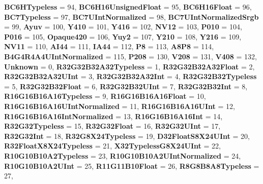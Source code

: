 \begin{DoxyCompactItemize}
{\bfseries B\+C6\+H\+Typeless} = 94, 
{\bfseries B\+C6\+H16\+Unsigned\+Float} = 95, 
\newline
{\bfseries B\+C6\+H16\+Float} = 96, 
{\bfseries B\+C7\+Typeless} = 97, 
{\bfseries B\+C7\+U\+Int\+Normalized} = 98, 
{\bfseries B\+C7\+U\+Int\+Normalized\+Srgb} = 99, 
\newline
{\bfseries Ayuv} = 100, 
{\bfseries Y410} = 101, 
{\bfseries Y416} = 102, 
{\bfseries N\+V12} = 103, 
\newline
{\bfseries P010} = 104, 
{\bfseries P016} = 105, 
{\bfseries Opaque420} = 106, 
{\bfseries Yuy2} = 107, 
\newline
{\bfseries Y210} = 108, 
{\bfseries Y216} = 109, 
{\bfseries N\+V11} = 110, 
{\bfseries A\+I44} = 111, 
\newline
{\bfseries I\+A44} = 112, 
{\bfseries P8} = 113, 
{\bfseries A8\+P8} = 114, 
{\bfseries B4\+G4\+R4\+A4\+U\+Int\+Normalized} = 115, 
\newline
{\bfseries P208} = 130, 
{\bfseries V208} = 131, 
{\bfseries V408} = 132, 
{\bfseries Unknown} = 0, 
\newline
{\bfseries R32\+G32\+B32\+A32\+Typeless} = 1, 
{\bfseries R32\+G32\+B32\+A32\+Float} = 2, 
{\bfseries R32\+G32\+B32\+A32\+U\+Int} = 3, 
{\bfseries R32\+G32\+B32\+A32\+Int} = 4, 
\newline
{\bfseries R32\+G32\+B32\+Typeless} = 5, 
{\bfseries R32\+G32\+B32\+Float} = 6, 
{\bfseries R32\+G32\+B32\+U\+Int} = 7, 
{\bfseries R32\+G32\+B32\+Int} = 8, 
\newline
{\bfseries R16\+G16\+B16\+A16\+Typeless} = 9, 
{\bfseries R16\+G16\+B16\+A16\+Float} = 10, 
{\bfseries R16\+G16\+B16\+A16\+U\+Int\+Normalized} = 11, 
{\bfseries R16\+G16\+B16\+A16\+U\+Int} = 12, 
\newline
{\bfseries R16\+G16\+B16\+A16\+Int\+Normalized} = 13, 
{\bfseries R16\+G16\+B16\+A16\+Int} = 14, 
{\bfseries R32\+G32\+Typeless} = 15, 
{\bfseries R32\+G32\+Float} = 16, 
\newline
{\bfseries R32\+G32\+U\+Int} = 17, 
{\bfseries R32\+G32\+Int} = 18, 
{\bfseries R32\+G8\+X24\+Typeless} = 19, 
{\bfseries D32\+Float\+S8\+X24\+U\+Int} = 20, 
\newline
{\bfseries R32\+Float\+X8\+X24\+Typeless} = 21, 
{\bfseries X32\+Typeless\+G8\+X24\+U\+Int} = 22, 
{\bfseries R10\+G10\+B10\+A2\+Typeless} = 23, 
{\bfseries R10\+G10\+B10\+A2\+U\+Int\+Normalized} = 24, 
\newline
{\bfseries R10\+G10\+B10\+A2\+U\+Int} = 25, 
{\bfseries R11\+G11\+B10\+Float} = 26, 
{\bfseries R8\+G8\+B8\+A8\+Typeless} = 27, 

\end{DoxyCompactItemize}
